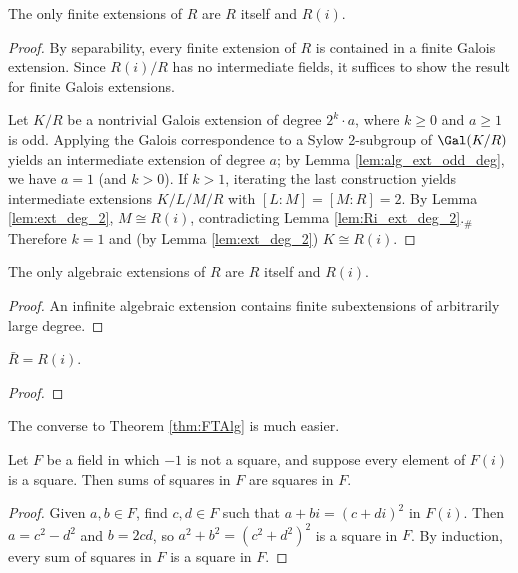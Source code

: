 \begin{theorem}
  \label{thm:FTAlg}
  \leanok
  The only finite extensions of $R$ are $R$ itself and $R(i)$.
\end{theorem}
\begin{proof}
  \leanok
  By separability, every finite extension of $R$ is contained in a finite Galois extension. Since $R(i)/R$ has no intermediate fields, it suffices to show the result for finite Galois extensions.
  
  Let $K/R$ be a nontrivial Galois extension of degree $2^k\cdot a$, where $k\geq 0$ and $a\geq1$ is odd. Applying the Galois correspondence to a Sylow 2-subgroup of $\Gal(K/R)$ yields an intermediate extension of degree $a$; by Lemma \ref{lem:alg_ext_odd_deg}, we have $a=1$ (and $k>0$). If $k>1$, iterating the last construction yields intermediate extensions $K/L/M/R$ with $[L:M]=[M:R]=2$. By Lemma \ref{lem:ext_deg_2}, $M\cong R(i)$, contradicting Lemma \ref{lem:Ri_ext_deg_2}.$_\#$ Therefore $k=1$ and (by Lemma \ref{lem:ext_deg_2}) $K\cong R(i)$.
\end{proof}

\begin{corollary}
  \label{cor:FTAlg_alg}
  \leanok
  The only algebraic extensions of $R$ are $R$ itself and $R(i)$.
\end{corollary}
\begin{proof}
  \leanok
  An infinite algebraic extension contains finite subextensions of arbitrarily large degree.
\end{proof}

\begin{corollary}
  \label{cor:RCF_ac}
  \leanok
  $\bar{R}=R(i)$.
\end{corollary}
\begin{proof}
  \leanok
\end{proof}

The converse to Theorem \ref{thm:FTAlg} is much easier.

\begin{lemma}
  \label{lem:sumsq_is_sq}
  \leanok
  Let $F$ be a field in which $-1$ is not a square, and suppose every element of $F(i)$ is a square. Then sums of squares in $F$ are squares in $F$.
\end{lemma}
\begin{proof}
  \leanok
  Given $a,b\in F$, find $c,d\in F$ such that $a+bi=(c+di)^2$ in $F(i)$. Then $a=c^2-d^2$ and $b=2cd$, so $a^2+b^2=(c^2+d^2)^2$ is a square in $F$. By induction, every sum of squares in $F$ is a square in $F$.
\end{proof}

